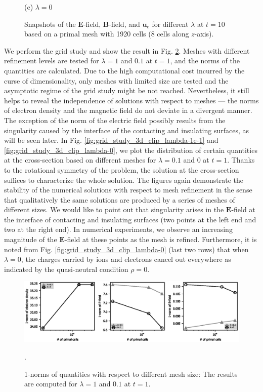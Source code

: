 \documentclass{report}
\begin{document}
\begin{figure}
    (c) $\lambda = 0$
    \caption{Snapshots of the $\mathbf{E}$-field, $\mathbf{B}$-field, and $\mathbf{u}_e$ for different $\lambda$ at $t = 10$ based on a primal mesh with 1920 cells (8 cells along $z$-axis). } 
    \label{fig:3d_vec_field_E_B_ue}
\end{figure}

We perform the grid study and show the result in Fig. \ref{fig:grid_study_3d}. Meshes with different refinement levels are tested for $\lambda = 1$ and $0.1$ at $t = 1$, and the norms of the quantities are calculated. Due to the high computational cost incurred by the curse of dimensionality, only meshes with limited size are tested and the asymptotic regime of the grid study might be not reached. Nevertheless, it still helps to reveal the independence of solutions with respect to meshes --- the norms of electron density and the magnetic field do not deviate in a divergent manner. The exception of the norm of the electric field possibly results from the singularity caused by the interface of the contacting and insulating surfaces, as will be seen later. 
In Fig. \ref{fig:grid_study_3d_clip_lambda-1e-1} and \ref{fig:grid_study_3d_clip_lambda-0}, we plot the distribution of certain quantities at the cross-section based on different meshes for $\lambda = 0.1$ and $0$ at $t = 1$. Thanks to the rotational symmetry of the problem, the solution at the cross-section suffices to characterize the whole solution. The figures again demonstrate the stability of the numerical solutions with respect to mesh refinement in the sense that qualitatively the same solutions are produced by a series of meshes of different sizes. We would like to point out that singularity arises in the $\mathbf{E}$-field at the interface of contacting and insulating surfaces (two points at the left end and two at the right end). In numerical experiments, we observe an increasing magnitude of the $\mathbf{E}$-field at these points as the mesh is refined. Furthermore, it is noted from Fig. \ref{fig:grid_study_3d_clip_lambda-0} (last two rows) that when $\lambda = 0$, the charges carried by ions and electrons cancel out everywhere as indicated by the quasi-neutral condition $\rho = 0$.

\begin{figure}
    \centering
    \includegraphics[scale=0.9]{norm_vs_nCell-T_1.eps}
    \caption{1-norms of quantities with respect to different mesh size: The results are computed for $\lambda = 1$ and $0.1$ at $t = 1$.}.
    \label{fig:grid_study_3d}
\end{figure}
\end{document}
